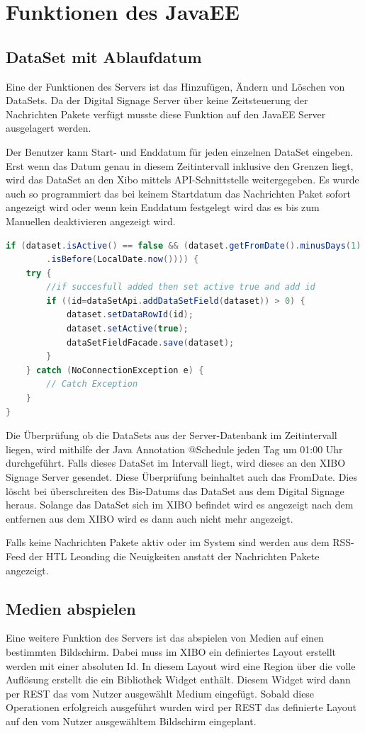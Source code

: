 \section{Funktionen des JavaEE}
\subsection{DataSet mit Ablaufdatum}\label{sec:datasetexpiredate}
Eine der Funktionen des Servers ist das Hinzufügen, Ändern und Löschen von DataSets. Da der Digital Signage Server über keine Zeitsteuerung der Nachrichten Pakete verfügt musste diese Funktion auf den JavaEE Server ausgelagert werden.

Der Benutzer kann Start- und Enddatum für jeden einzelnen DataSet eingeben. Erst wenn das Datum genau in diesem Zeitintervall inklusive den Grenzen liegt, wird das DataSet an den Xibo mittels API-Schnittstelle weitergegeben. Es wurde auch so programmiert das bei keinem Startdatum das Nachrichten Paket sofort angezeigt wird oder wenn kein Enddatum festgelegt wird das es bis zum Manuellen deaktivieren angezeigt wird.

\begin{lstlisting}[language=Java, caption={public void doCheckEvery24Hours()}]
if (dataset.isActive() == false && (dataset.getFromDate().minusDays(1)
        .isBefore(LocalDate.now()))) {
    try {
        //if succesfull added then set active true and add id
        if ((id=dataSetApi.addDataSetField(dataset)) > 0) {
            dataset.setDataRowId(id);
            dataset.setActive(true);
            dataSetFieldFacade.save(dataset);
        }
    } catch (NoConnectionException e) {
        // Catch Exception
    }
}
\end{lstlisting}

Die Überprüfung ob die DataSets aus der Server-Datenbank im Zeitintervall liegen, wird mithilfe der Java Annotation @Schedule jeden Tag um 01:00 Uhr durchgeführt. Falls dieses DataSet im Intervall liegt, wird dieses an den XIBO Signage Server gesendet. Diese Überprüfung beinhaltet auch das FromDate. Dies löscht bei überschreiten des Bis-Datums das DataSet aus dem Digital Signage heraus. Solange das DataSet sich im XIBO befindet wird es angezeigt nach dem entfernen aus dem XIBO wird es dann auch nicht mehr angezeigt.

Falls keine Nachrichten Pakete aktiv oder im System sind werden aus dem RSS-Feed der HTL Leonding die Neuigkeiten anstatt der Nachrichten Pakete angezeigt.

\subsection{Medien abspielen}\label{sec:playmedia}
Eine weitere Funktion des Servers ist das abspielen von Medien auf einen bestimmten Bildschirm. Dabei muss im XIBO ein definiertes Layout erstellt werden mit einer absoluten Id. In diesem Layout wird eine Region über die volle Auflösung erstellt die ein Bibliothek Widget enthält. Diesem Widget wird dann per REST das vom Nutzer ausgewählt Medium eingefügt. Sobald diese Operationen erfolgreich ausgeführt wurden wird per REST das definierte Layout auf den vom Nutzer ausgewähltem Bildschirm eingeplant.


